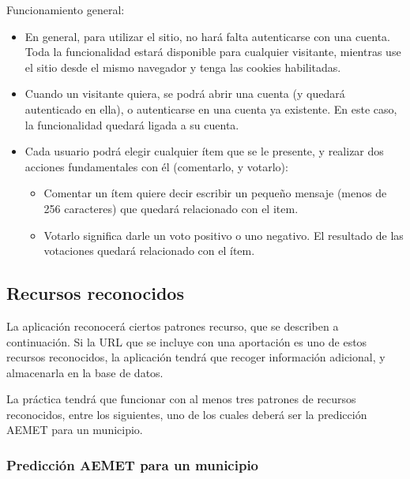 Funcionamiento general:

\begin{itemize}
\item En general, para utilizar el sitio, no hará falta autenticarse con una cuenta. Toda la funcionalidad estará disponible para cualquier visitante, mientras use el sitio desde el mismo navegador y tenga las cookies habilitadas.

\item Cuando un visitante quiera, se podrá abrir una cuenta (y quedará autenticado en ella), o autenticarse en una cuenta ya existente. En este caso, la funcionalidad quedará ligada a su cuenta.
  
\item Cada usuario podrá elegir cualquier ítem que se le presente, y realizar dos acciones fundamentales con él (comentarlo, y votarlo):
  \begin{itemize}
  \item Comentar un ítem quiere decir escribir un pequeño mensaje (menos de 256 caracteres) que quedará relacionado con el item.
  \item Votarlo significa darle un voto positivo o uno negativo. El resultado de las votaciones quedará relacionado con el ítem.
  \end{itemize}

\end{itemize}


\subsection{Recursos reconocidos}
\label{sec:practica-final-2021-05:reconocidos}

La aplicación reconocerá ciertos patrones recurso, que se describen a continuación. Si la URL que se incluye con una aportación es uno de estos recursos reconocidos, la aplicación tendrá que recoger información adicional, y almacenarla en la base de datos.

La práctica tendrá que funcionar con al menos tres patrones de recursos reconocidos, entre los siguientes, uno de los cuales deberá ser la predicción AEMET para un municipio.

\subsubsection{Predicción AEMET para un municipio}

